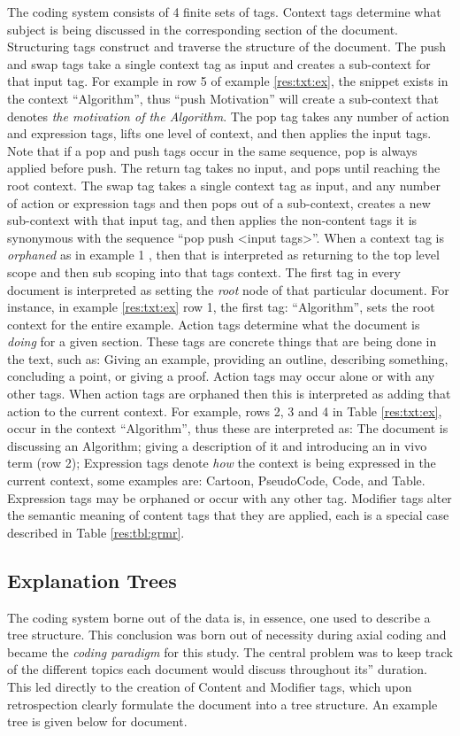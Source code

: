 \documentclass[sigconf]{acmart}
\begin{document}
The coding system consists of 4 finite sets of tags. Context tags determine what
subject is being discussed in the corresponding section of the document.
%
Structuring tags construct and traverse the structure of the document. The
push and swap tags take a single context tag as input and creates a sub-context
for that input tag. For example in row 5 of example \ref{res:txt:ex}, the
snippet exists in the context ``Algorithm'', thus ``push Motivation'' will
create a sub-context that denotes \emph{the motivation of the Algorithm}.
%
The pop tag takes any number of action and expression tags, lifts one level of
context, and then applies the input tags. Note that if a pop and push tags occur
in the same sequence, pop is always applied before push. The return tag takes no
input, and pops until reaching the root context. The swap tag takes a single
context tag as input, and any number of action or expression tags and then pops
out of a sub-context, creates a new sub-context with that input tag, and
then applies the non-content tags it is synonymous with the sequence ``pop push
<input tags>''.
%
When a context tag is \emph{orphaned} as in example 1 , then that is interpreted as returning to the top level scope and then
sub scoping into that tags context. The first tag in every document is
interpreted as setting the \emph{root} node of that particular document. For
instance, in example \ref{res:txt:ex} row 1, the first tag: ``Algorithm'', sets
the root context for the entire example.
%
Action tags determine what the document is \emph{doing} for a given section.
These tags are concrete things that are being done in the text, such as: Giving
an example, providing an outline, describing something, concluding a point, or
giving a proof. Action tags may occur alone or with any other tags. When action
tags are orphaned then this is interpreted as adding that action to the current
context. For example, rows 2, 3 and 4 in Table \ref{res:txt:ex}, occur in the
context ``Algorithm'', thus these are interpreted as: The document is discussing
an Algorithm; giving a description of it and introducing an in vivo term (row
2); 
%
Expression tags denote \emph{how} the context is being expressed in the current
context, some examples are: Cartoon, PseudoCode, Code, and Table. Expression
tags may be orphaned or occur with any other tag. Modifier tags alter the
semantic meaning of content tags that they are applied, each is a special case
described in Table \ref{res:tbl:grmr}.
%

\subsection{Explanation Trees}
\label{sec:res:xopTree}
The coding system borne out of the data is, in essence, one used to describe a
tree structure. This conclusion was born out of necessity during axial coding
and became the \emph{coding paradigm} for this study. The central problem was to
keep track of the different topics each document would discuss throughout its''
duration. This led directly to the creation of Content and Modifier tags, which
upon retrospection clearly formulate the document into a tree structure. An
example tree is given below for document.
\end{document}
